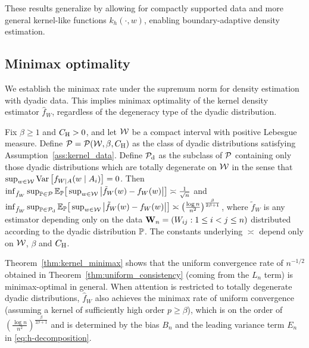 These results generalize \citet*[Theorem~1]{chiang2020empirical}
by allowing for compactly supported data and more general kernel-like
functions $k_h(\cdot,w)$, enabling boundary-adaptive density estimation.

\subsection{Minimax optimality}

We establish the minimax rate under the
supremum norm for density estimation
with dyadic data.
This implies minimax optimality of the kernel density estimator $\hat
f_W$, regardless of the degeneracy type of the dyadic distribution.

\begin{theorem} \label{thm:kernel_minimax}

  Fix $\beta \geq 1$ and $\CH > 0$,
  and let $\cW$ be a compact interval with positive Lebesgue measure.
  Define $\cP = \cP(\cW, \beta, \CH)$
  as the class of dyadic distributions
  satisfying Assumption~\ref{ass:kernel_data}.
  Define $\cPd$ as the subclass of $\cP$
  containing only those dyadic distributions
  which are totally degenerate on $\cW$ in the sense that
  $\sup_{w \in \cW} \Var\left[f_{W \mid A}(w \mid A_i)\right] = 0$.
  Then
  $\inf_{\tilde f_W} \sup_{\P \in \cP}
  \E_\P\big[\sup_{w \in \cW} \big| \tilde f_W(w) - f_W(w) \big| \big]
  \asymp \frac{1}{\sqrt n}$
  and
  $\inf_{\tilde f_W} \sup_{\P \in \cPd}
  \E_\P\big[\sup_{w \in \cW} \big| \tilde f_W(w) - f_W(w) \big| \big]
  \asymp \big( \frac{\log n}{n^2} \big)^{\frac{\beta}{2\beta+1}}$,
  where $\tilde f_W$ is any estimator depending only on
  the data $\bW_n = (W_{i j}: 1 \leq i < j \leq n)$
  distributed according to the dyadic distribution $\P$.
  The constants underlying $\asymp$ depend only on
  $\cW$, $\beta$ and $\CH$.

\end{theorem}

Theorem~\ref{thm:kernel_minimax} shows that the uniform convergence rate of
$n^{-1/2}$
obtained in Theorem~\ref{thm:uniform_consistency}
(coming from the $L_n$ term) is minimax-optimal in general.
When attention is restricted to totally degenerate dyadic distributions,
$\hat f_W$ also achieves the minimax rate of uniform convergence
(assuming a kernel of sufficiently high order $p \geq \beta$),
which is on the order of
$\left(\frac{\log n}{n^2}\right)^{\frac{\beta}{2\beta+1}}$ and
is determined by the bias $B_n$ and the leading variance term $E_n$ in
\eqref{eq:h-decomposition}.

